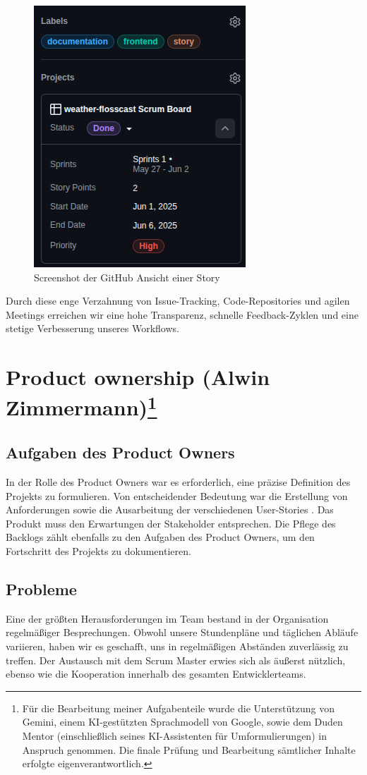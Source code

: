 \documentclass{article}
\begin{document}
\begin{figure}[h]
  \caption{Screenshot der GitHub Ansicht einer Story}
  \centering
  \includegraphics[width=.3\textwidth]{overview.png}
\end{figure}

Durch diese enge Verzahnung von Issue-Tracking, Code-Repositories und agilen Meetings erreichen wir eine hohe Transparenz, schnelle Feedback-Zyklen und eine stetige Verbesserung unseres Workflows.

\section[Product ownership \small{(Alwin Zimmermann)}]{Product ownership \small{(Alwin Zimmermann)}\footnote{Für die Bearbeitung meiner Aufgabenteile wurde die Unterstützung von Gemini, einem KI-gestützten Sprachmodell von Google, sowie dem Duden Mentor (einschließlich seines KI-Assistenten für Umformulierungen) in Anspruch genommen. Die finale Prüfung und Bearbeitung sämtlicher Inhalte erfolgte eigenverantwortlich.}}
\subsection{Aufgaben des Product Owners}
In der Rolle des Product Owners war es erforderlich, eine präzise Definition des Projekts zu formulieren. Von entscheidender Bedeutung war die Erstellung von Anforderungen sowie die Ausarbeitung der verschiedenen User-Stories . Das Produkt muss den Erwartungen der Stakeholder entsprechen. Die Pflege des Backlogs zählt ebenfalls zu den Aufgaben des Product Owners, um den Fortschritt des Projekts zu dokumentieren.

\subsection{Probleme}
Eine der größten Herausforderungen im Team bestand in der Organisation regelmäßiger Besprechungen. Obwohl unsere Stundenpläne und täglichen Abläufe variieren, haben wir es geschafft, uns in regelmäßigen Abständen zuverlässig zu treffen. Der Austausch mit dem Scrum Master erwies sich als äußerst nützlich, ebenso wie die Kooperation innerhalb des gesamten Entwicklerteams.
\end{document}

